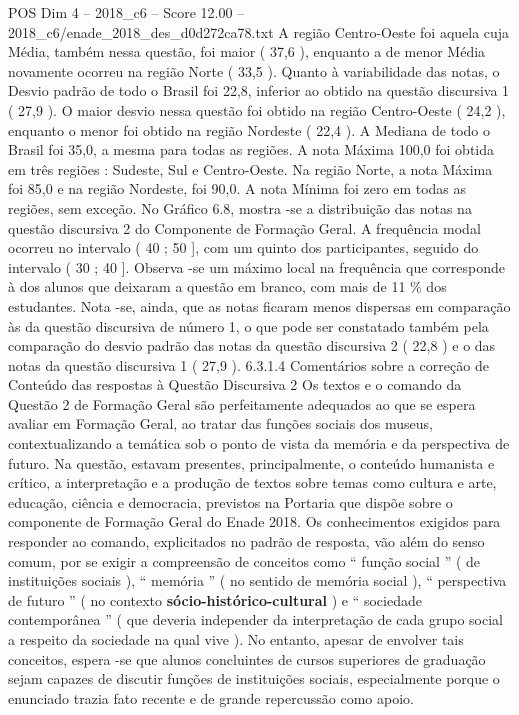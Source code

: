 \begin{textsample}{POS Dim 4 – 2018\_c6 – Score 12.00 – 2018\_c6/enade\_2018\_des\_d0d272ca78.txt}
A região Centro-Oeste foi aquela cuja Média, também nessa questão, foi maior ( 37,6 ), enquanto a de menor Média novamente ocorreu na região Norte ( 33,5 ).
Quanto à variabilidade das notas, o Desvio padrão de todo o Brasil foi 22,8, inferior ao obtido na questão discursiva 1 ( 27,9 ).
O maior desvio nessa questão foi obtido na região Centro-Oeste ( 24,2 ), enquanto o menor foi obtido na região Nordeste ( 22,4 ).
A Mediana de todo o Brasil foi 35,0, a mesma para todas as regiões.
A nota Máxima 100,0 foi obtida em três regiões : Sudeste, Sul e Centro-Oeste.
Na região Norte, a nota Máxima foi 85,0 e na região Nordeste, foi 90,0.
A nota Mínima foi zero em todas as regiões, sem exceção.
No Gráfico 6.8, mostra -se a distribuição das notas na questão discursiva 2 do Componente de Formação Geral.
A frequência modal ocorreu no intervalo ( 40 ; 50 ], com um quinto dos participantes, seguido do intervalo ( 30 ; 40 ].
Observa -se um máximo local na frequência que corresponde à dos alunos que deixaram a questão em branco, com mais de 11 \% dos estudantes.
Nota -se, ainda, que as notas ficaram menos dispersas em comparação às da questão discursiva de número 1, o que pode ser constatado também pela comparação do desvio padrão das notas da questão discursiva 2 ( 22,8 ) e o das notas da questão discursiva 1 ( 27,9 ). 6.3.1.4 Comentários sobre a correção de Conteúdo das respostas à Questão Discursiva 2 Os textos e o comando da Questão 2 de Formação Geral são perfeitamente adequados ao que se espera avaliar em Formação Geral, ao tratar das funções sociais dos museus, contextualizando a temática sob o ponto de vista da memória e da perspectiva de futuro.
Na questão, estavam presentes, principalmente, o conteúdo humanista e crítico, a interpretação e a produção de textos sobre temas como cultura e arte, educação, ciência e democracia, previstos na Portaria que dispõe sobre o componente de Formação Geral do Enade 2018.
Os conhecimentos exigidos para responder ao comando, explicitados no padrão de resposta, vão além do senso comum, por se exigir a compreensão de conceitos como “ função social ” ( de instituições sociais ), “ memória ” ( no sentido de memória social ), “ perspectiva de futuro ” ( no contexto \textbf{sócio-histórico-cultural} ) e “ sociedade contemporânea ” ( que deveria independer da interpretação de cada grupo social a respeito da sociedade na qual vive ).
No entanto, apesar de envolver tais conceitos, espera -se que alunos concluintes de cursos superiores de graduação sejam capazes de discutir funções de instituições sociais, especialmente porque o enunciado trazia fato recente e de grande repercussão como apoio.

\end{textsample}
